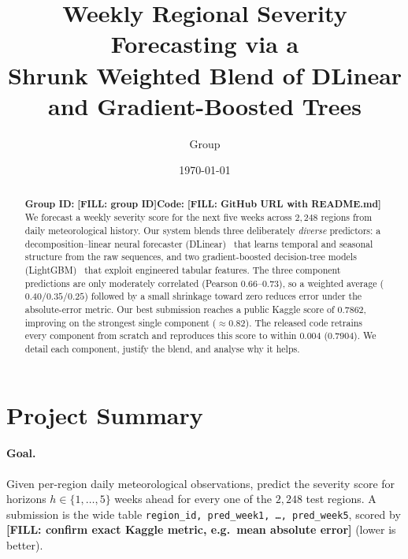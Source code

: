 \documentclass[11pt]{article}
\title{\textbf{Weekly Regional Severity Forecasting via a\\
Shrunk Weighted Blend of DLinear and Gradient-Boosted Trees}}
\author{Group \FILL{group ID}\\ \texttt{\FILL{GitHub repository URL (must contain README.md)}}}
\date{\today}
\newcommand{\FILL}[1]{{\color{red}\textbf{[FILL: #1]}}}
\begin{document}
\maketitle

\begin{abstract}
\noindent\textbf{Group ID:} \FILL{group ID}\quad\textbf{Code:} \FILL{GitHub URL with README.md}\\[4pt]
We forecast a weekly severity score for the next five weeks across $2{,}248$ regions from daily
meteorological history. Our system blends three deliberately \emph{diverse} predictors: a
decomposition--linear neural forecaster (DLinear)~\citep{zeng2023dlinear} that learns temporal
and seasonal structure from the raw sequences, and two gradient-boosted decision-tree models
(LightGBM)~\citep{ke2017lightgbm} that exploit engineered tabular features. The three component
predictions are only moderately correlated (Pearson $0.66$--$0.73$), so a weighted average
($0.40/0.35/0.25$) followed by a small shrinkage toward zero reduces error under the absolute-error
metric. Our best submission reaches a public Kaggle score of $0.7862$, improving on the strongest
single component ($\approx 0.82$). The released code retrains every component from scratch and
reproduces this score to within $0.004$ ($0.7904$). We detail each component, justify the blend,
and analyse why it helps.
\end{abstract}

\section{Project Summary}
\paragraph{Goal.}
Given per-region daily meteorological observations, predict the severity score for horizons
$h\in\{1,\dots,5\}$ weeks ahead for every one of the $2{,}248$ test regions. A submission is the
wide table \texttt{region\_id, pred\_week1, \dots, pred\_week5}, scored by
\FILL{confirm exact Kaggle metric, e.g.\ mean absolute error} (lower is better).
\end{document}
